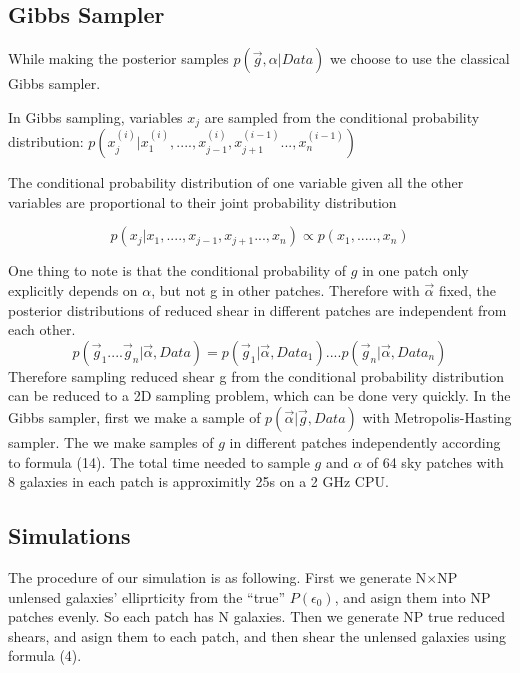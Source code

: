 \documentclass[useAMS,usenatbib]{mn2e}
\begin{document}
\subsection{Gibbs Sampler}

While making the posterior samples $p(\vec{g},\alpha|Data)$ we choose to
use the classical Gibbs sampler.

In Gibbs sampling, variables $x_{j}$ are sampled from the conditional
probability distribution: $p(x_{j}^{(i)}|x_{1}^{(i)},....,x_{j-1}^{(i)},x_{j+1}^{(i-1)}...,x_{n}^{(i-1)})$

The conditional probability distribution of one variable given all the other variables are proportional to their joint probability distribution

\begin{equation}
p(x_{j}|x_{1},....,x_{j-1},x_{j+1}...,x_{n})\propto p(x_{1},.....,x_{n})
\end{equation}


One thing to note is that the conditional probability of $g$ in one patch only explicitly depends on $\alpha$, but not g in other patches. Therefore
with $\vec{\alpha}$ fixed, the posterior distributions of reduced shear in different patches are independent from each other. 
\begin{equation}
p(\vec{g}_{1}....\vec{g}_{n}|\vec{\alpha},Data)=p(\vec{g}_{1}|\vec{\alpha},Data_{1})....p(\vec{g}_{n}|\vec{\alpha},Data_{n})
\end{equation}
Therefore sampling reduced shear g from the conditional probability distribution can be reduced to a 2D sampling problem, which can be done very quickly.
In the Gibbs sampler, first we make a sample of $p(\vec{\alpha}|\vec{g},Data)$ with Metropolis-Hasting sampler. The we make samples of $g$ in different patches
independently according to formula (14).
The total time needed to sample $g$ and $\alpha$ of 64 sky patches with 8 galaxies in each patch is 
approximitly 25s on a 2 GHz CPU.


\subsection{Simulations}

The procedure of our simulation is as following. First we generate N$\times$NP
unlensed galaxies' elliprticity from the ``true'' $P(\epsilon_{0})$, and
asign them into NP patches evenly. So each patch has N galaxies. Then
we generate NP true reduced shears, and asign them to each patch, and
then shear the unlensed galaxies using formula (4).
\end{document}
